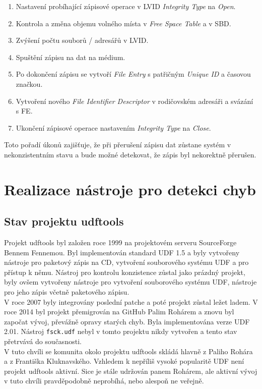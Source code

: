 \begin{enumerate}
    \item Nastavení probíhající zápisové operace v LVID \textit{Integrity Type} na \textit{Open}.
    \item Kontrola a změna objemu volného místa v \textit{Free Space Table} a v SBD.
    \item Zvýšení počtu souborů / adresářů v LVID.
    \item Spuštění zápisu na dat na médium.
    \item Po dokončení zápisu se vytvoří \textit{File Entry} s patřičným \textit{Unique ID} a časovou značkou. 
    \item Vytvoření nového \textit{File Identifier Descriptor} v rodičovském adresáři a svázání s FE.
    \item Ukončení zápisové operace nastavením \textit{Integrity Type} na \textit{Close}.
\end{enumerate}
Toto pořadí úkonů zajišťuje, že při přerušení zápisu dat zůstane systém v nekonzistentním stavu a bude možné detekovat, že zápis byl nekorektně přerušen.

\chapter{Realizace nástroje pro detekci chyb}
\section{Stav projektu udftools}
Projekt udftools byl založen roce 1999 na projektovém serveru SourceForge \cite{udftools-sourceforge} Bennem Fennemou. Byl implementován standard UDF 1.5 a byly vytvořeny nástroje pro paketový zápis na CD, vytvoření souborového systému UDF a pro přístup k němu. Nástroj pro kontrolu konzistence zůstal jako prázdný projekt, byly ovšem vytvořeny nástroje pro vytvoření souborového systému UDF, nástroje pro jeho zápis včetně paketového zápisu.\\
V roce 2007 byly integrovány poslední patche a poté projekt zůstal ležet ladem. V roce 2014 byl projekt přemigrován na GitHub \cite{udftools-github} Palim Rohárem a znovu byl započat vývoj, převážně opravy starých chyb. Byla implementována verze UDF 2.01. Nástroj \texttt{fsck.udf} nebyl v tomto projektu nikdy vytvořen a tento stav přetrvává do současnosti.\\
V tuto chvíli se komunita okolo projektu udftools skládá hlavně z Paliho Rohára a z Františka Kluknavského. Vzhledem k nepříliš vysoké popularitě UDF není projekt udftools aktivní. Sice je stále udržován panem Rohárem, ale aktivní vývoj v tuto chvíli pravděpodobně neprobíhá, nebo alespoň ne veřejně.

